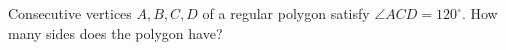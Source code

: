 Consecutive vertices $A,B,C,D$ of a regular polygon satisfy $\angle ACD=120^\circ$. How many sides does the polygon have?
